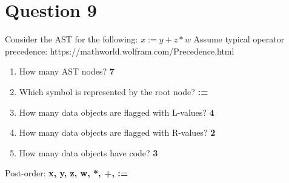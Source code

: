 \documentclass{article}
\begin{document}
\section*{Question 9}
Consider the AST for the following: $x := y + z * w$ Assume typical operator precedence: \newline
https://mathworld.wolfram.com/Precedence.html \newline
\vspace{-1.5em}
\begin{multicols}{2}
  \begin{enumerate}[wide, labelwidth=!, labelindent=-1pt]
    \item How many AST nodes? \textbf{7}
    \item Which symbol is represented by the root node? \textbf{:=}
    \item How many data objects are flagged with L-values? \textbf{4}
    \item How many data objects are flagged with R-values? \textbf{2}
    \item How many data objects have code? \textbf{3}
  \end{enumerate}
  Post-order: \textbf{x, y, z, w, *, +, :=}
\end{multicols}
\end{document}
